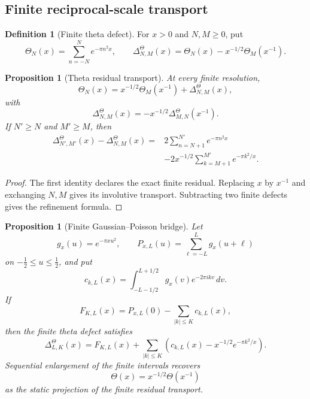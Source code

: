 \documentclass[11pt,a4paper]{article}
\newtheorem{proposition}[theorem]{Proposition}
\theoremstyle{definition}
\newtheorem{definition}[theorem]{Definition}
\begin{document}
\subsection{Finite reciprocal-scale transport}

\begin{definition}[Finite theta defect]
\label{def:finite-theta-defect}
For $x>0$ and $N,M\geq0$, put
\[
  \Theta_N(x)=\sum_{n=-N}^{N}e^{-\pi n^2x},
  \qquad
  \Delta_{N,M}^{\Theta}(x)
  =
  \Theta_N(x)-x^{-1/2}\Theta_M(x^{-1}).
\]
\end{definition}

\begin{proposition}[Theta residual transport]
\label{prop:theta-residual-transport}
At every finite resolution,
\begin{equation}
\label{eq:theta-residual-transport}
  \Theta_N(x)
  =
  x^{-1/2}\Theta_M(x^{-1})
  +\Delta_{N,M}^{\Theta}(x),
\end{equation}
with
\[
  \Delta_{N,M}^{\Theta}(x)
  =
  -x^{-1/2}\Delta_{M,N}^{\Theta}(x^{-1}).
\]
If $N'\geq N$ and $M'\geq M$, then
\begin{align*}
\Delta_{N',M'}^{\Theta}(x)-\Delta_{N,M}^{\Theta}(x)
={}&2\sum_{n=N+1}^{N'}e^{-\pi n^2x}\\
&-2x^{-1/2}\sum_{k=M+1}^{M'}e^{-\pi k^2/x}.
\end{align*}
\end{proposition}

\begin{proof}
The first identity declares the exact finite residual. Replacing $x$ by
$x^{-1}$ and exchanging $N,M$ gives its involutive transport. Subtracting two
finite defects gives the refinement formula.
\end{proof}

\begin{proposition}[Finite Gaussian--Poisson bridge]
\label{prop:finite-gaussian-poisson-bridge}
Let
\[
  g_x(u)=e^{-\pi xu^2},
  \qquad
  P_{x,L}(u)=\sum_{\ell=-L}^{L}g_x(u+\ell)
\]
on $-\tfrac12\leq u\leq\tfrac12$, and put
\[
  c_{k,L}(x)
  =
  \int_{-L-1/2}^{L+1/2}
  g_x(v)e^{-2\pi ikv}\,dv.
\]
If
\[
  F_{K,L}(x)=P_{x,L}(0)-\sum_{|k|\leq K}c_{k,L}(x),
\]
then the finite theta defect satisfies
\begin{equation}
\label{eq:finite-gaussian-poisson-bridge}
  \Delta_{L,K}^{\Theta}(x)
  =
  F_{K,L}(x)
  +\sum_{|k|\leq K}
   \left(
     c_{k,L}(x)-x^{-1/2}e^{-\pi k^2/x}
   \right).
\end{equation}
Sequential enlargement of the finite intervals recovers
\begin{equation}
\label{eq:jacobi-inversion-recovered}
  \Theta(x)=x^{-1/2}\Theta(x^{-1})
\end{equation}
as the static projection of the finite residual transport.
\end{proposition}
\end{document}
